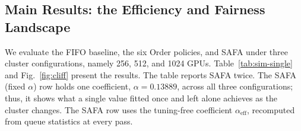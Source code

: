 \documentclass{ieeetj}
\begin{document}
\subsection{Main Results: the Efficiency and Fairness Landscape}\label{eval:main}
We evaluate the FIFO baseline, the six Order policies, and SAFA under three cluster configurations, namely 256, 512, and 1024 GPUs. Table~\ref{tab:sim-single} and Fig.~\ref{fig:cliff} present the results. The table reports SAFA twice. The SAFA (fixed $\alpha$) row holds one coefficient, $\alpha=0.13889$, across all three configurations; thus, it shows what a single value fitted once and left alone achieves as the cluster changes. The SAFA row uses the tuning-free coefficient $\alpha_{\text{eff}}$, recomputed from queue statistics at every pass.

\begin{table}[htb!]
\centering
\caption{Main results: order fairness (Fairness and Overtaken), queueing delay, resource utilization, and distributional fairness (Gini and TailRatio)}
\scriptsize
\setlength{\tabcolsep}{2.5pt}
\end{table}
\end{document}

